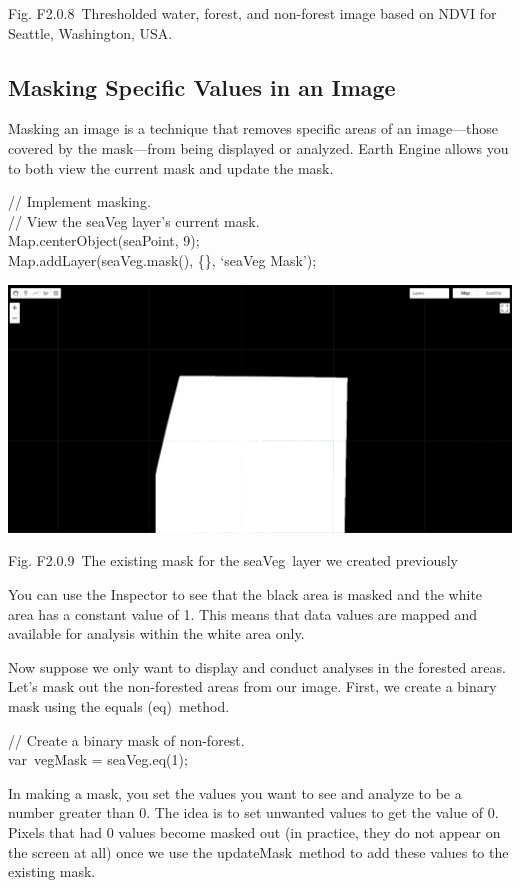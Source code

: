 \documentclass[
  letterpaper,
  DIV=11,
  numbers=noendperiod]{scrreprt}
\begin{document}
Fig. F2.0.8~Thresholded water, forest, and non-forest image based on
NDVI for Seattle, Washington, USA.

\hypertarget{masking-specific-values-in-an-image}{%
\subsection{Masking Specific Values in an
Image}\label{masking-specific-values-in-an-image}}

Masking an image is a technique that removes specific areas of an
image---those covered by the mask---from being displayed or analyzed.
Earth Engine allows you to both view the current mask and update the
mask.

// Implement masking.\\
// View the seaVeg layer's current mask.\\
Map.centerObject(seaPoint, 9);\\
Map.addLayer(seaVeg.mask(), \{\}, `seaVeg Mask');

\includegraphics{./F2/image23.png}

Fig. F2.0.9~The existing mask for the seaVeg~layer we created previously

You can use the Inspector to see that the black area is masked and the
white area has a constant value of 1. This means that data values are
mapped and available for analysis within the white area only.

Now suppose we only want to display and conduct analyses in the forested
areas. Let's mask out the non-forested areas from our image. First, we
create a binary mask using the equals (eq)~method.

// Create a binary mask of non-forest.\\
var~vegMask = seaVeg.eq(1);

In making a mask, you set the values you want to see and analyze to be a
number greater than 0. The idea is to set unwanted values to get the
value of 0. Pixels that had 0 values become masked out (in practice,
they do not appear on the screen at all) once we use the
updateMask~method to add these values to the existing mask.
\end{document}
